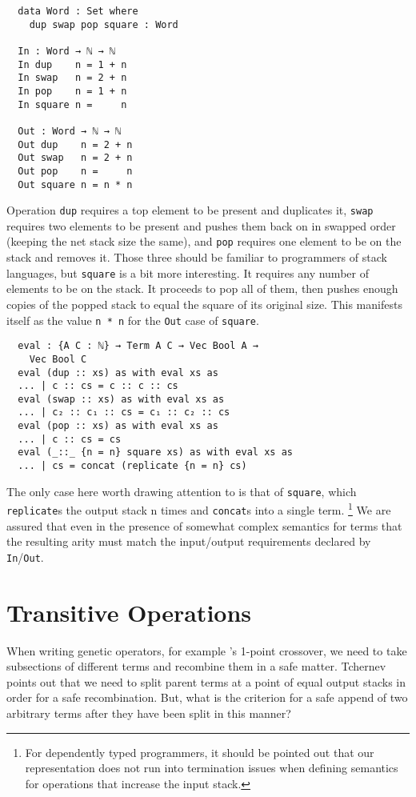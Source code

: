 \documentclass{acm_proc_article-sp}
\begin{document}
\begin{verbatim}
  data Word : Set where
    dup swap pop square : Word

  In : Word → ℕ → ℕ
  In dup    n = 1 + n
  In swap   n = 2 + n
  In pop    n = 1 + n
  In square n =     n

  Out : Word → ℕ → ℕ
  Out dup    n = 2 + n
  Out swap   n = 2 + n
  Out pop    n =     n
  Out square n = n * n
\end{verbatim}

Operation \texttt{dup} requires a top element to be present and
duplicates it, \texttt{swap} requires two elements to be present and
pushes them back on in swapped order (keeping the net stack size the
same), and \texttt{pop} requires one element to be on the stack and
removes it. Those three should be familiar to programmers of stack
languages, but \texttt{square} is a bit more interesting. It requires
any number of elements to be on the stack. It proceeds to pop all of
them, then pushes enough copies of the popped stack to equal the
square of its original size. This manifests itself as the value
\texttt{n * n} for the \texttt{Out} case of \texttt{square}.

\begin{verbatim}
  eval : {A C : ℕ} → Term A C → Vec Bool A →
    Vec Bool C
  eval (dup :: xs) as with eval xs as
  ... | c :: cs = c :: c :: cs
  eval (swap :: xs) as with eval xs as
  ... | c₂ :: c₁ :: cs = c₁ :: c₂ :: cs
  eval (pop :: xs) as with eval xs as
  ... | c :: cs = cs
  eval (_::_ {n = n} square xs) as with eval xs as
  ... | cs = concat (replicate {n = n} cs)
\end{verbatim}

The only case here worth drawing attention to is that of
\texttt{square}, which \texttt{replicate}s the output stack n times
and \texttt{concat}s into a single term.
\footnote{For dependently typed programmers, it should be pointed out
  that our representation does not run into termination issues when
  defining semantics for operations that increase the input stack. }
We are assured that even in the presence of somewhat complex semantics
for terms that the resulting arity must match the input/output
requirements declared by \texttt{In}/\texttt{Out}.

\section{Transitive Operations}

When writing genetic operators, for example
\cite{tchernev:forthcross}'s 1-point crossover, we need to take
subsections of different terms and recombine them in a safe
matter. Tchernev points out that we need to split parent terms at a
point of equal output stacks in order for a safe recombination. But,
what is the criterion for a safe append of two arbitrary terms after
they have been split in this manner?
\end{document}
